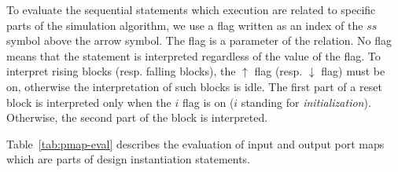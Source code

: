 To evaluate the sequential statements which execution are related to
specific parts of the simulation algorithm, we use a flag written as
an index of the $ss$ symbol above the arrow symbol. The flag is a
parameter of the relation. No flag means that the statement is
interpreted regardless of the value of the flag. To interpret rising
blocks (resp. falling blocks), the $\uparrow$ flag (resp. $\downarrow$
flag) must be on, otherwise the interpretation of such blocks is idle.
The first part of a reset block is interpreted only when the $i$ flag
is on ($i$ standing for \textit{initialization}). Otherwise, the
second part of the block is interpreted.

Table~\ref{tab:pmap-eval} describes the evaluation of input and output
port maps which are parts of design instantiation statements. 

